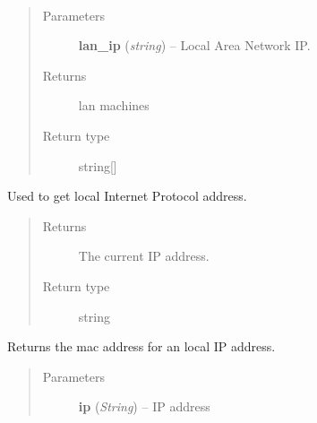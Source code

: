 \documentclass[letterpaper,10pt,english]{sphinxmanual}
\begin{document}
\begin{fulllineitems}
\label{utils:utils.GetLANMachines}~\begin{quote}\begin{description}
\item[{Parameters}] \leavevmode
\textbf{lan\_ip} (\emph{string}) -- Local Area Network IP.

\item[{Returns}] \leavevmode
lan machines

\item[{Return type}] \leavevmode
string{[}{]}

\end{description}\end{quote}

\end{fulllineitems}


\begin{fulllineitems}
\label{utils:utils.GetLocalIPAddress}
Used to get local Internet Protocol address.
\begin{quote}\begin{description}
\item[{Returns}] \leavevmode
The current IP address.

\item[{Return type}] \leavevmode
string

\end{description}\end{quote}

\end{fulllineitems}


\begin{fulllineitems}
\label{utils:utils.GetMacForIp}
Returns the mac address for an local IP address.
\begin{quote}\begin{description}
\item[{Parameters}] \leavevmode
\textbf{ip} (\emph{String}) -- IP address

\end{description}\end{quote}

\end{fulllineitems}
\end{document}
